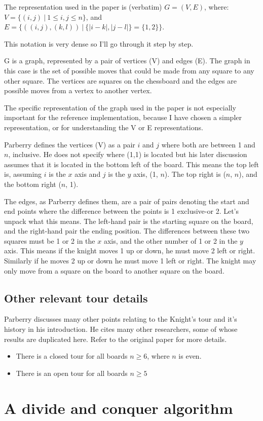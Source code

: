 \documentclass[11pt, a4paper]{article}
\begin{document}
The representation used in the paper is (verbatim) $G = (V,E)$, where: $V = \{(i,j)\ |\ 1 \le i,j \le n\}$, and $E = \{((i,j),(k,l))\ |\ \{|i-k|,|j-l|\} = \{1,2\}\}$.

This notation is very dense so I'll go through it step by step.

G is a graph, represented by a pair of vertices (V) and edges (E). The graph in this case is the set of possible moves that could be made from any square to any other square. The vertices are squares on the chessboard and the edges are possible moves from a vertex to another vertex.

The specific representation of the graph used in the paper is not especially important for the reference implementation, because I have chosen a simpler representation, or for understanding the V or E representations.

Parberry defines the vertices (V) as a pair $i$ and $j$ where both are between 1 and $n$, inclusive. He does not specify where (1,1) is located but his later discussion assumes that it is located in the bottom left of the board. This means the top left is, assuming $i$ is the $x$ axis and $j$ is the $y$ axis, (1, $n$). The top right is ($n$, $n$), and the bottom right ($n$, 1).


The edges, as Parberry defines them, are a pair of pairs denoting the start and end points where the difference between the points is 1 exclusive-or 2. Let's unpack what this means. The left-hand pair is the starting square on the board, and the right-hand pair the ending position. The differences between these two squares must be 1 or 2 in the $x$ axis, and the other number of 1 or 2 in the $y$ axis. This means if the knight moves 1 up or down, he must move 2 left or right. Similarly if he moves 2 up or down he must move 1 left or right. The knight may only move from a square on the board to another square on the board.


\subsection{Other relevant tour details}

Parberry discusses many other points relating to the Knight's tour and it's history in his introduction. He cites many other researchers, some of whose results are duplicated here. Refer to the original paper for more details.

\begin{itemize}
\item There is a closed tour for all boards $n \ge 6$, where $n$ is even.
\item There is an open tour for all boards $n \ge 5$
\end{itemize}

\section{A divide and conquer algorithm}
\end{document}
